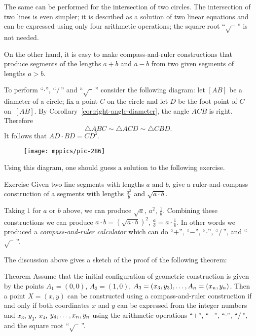 The same can be performed for the intersection of two circles. 
The intersection of two lines is even simpler; 
it is described as a solution of two linear equations and can be expressed using only four arithmetic operations;
the square root ``$\sqrt{\phantom{a}}\,$'' is not needed.

\medskip

On the other hand, it is easy to make compass-and-ruler constructions that produce segments of the lengths $a+b$ and $a-b$ from two given segments of lengths $a>b$.

To perform ``$\cdot$'', ``$/\,$''
and ``$\sqrt{\phantom{a}}\,$'' consider the following diagram:
let $[AB]$ be a diameter of a circle; 
fix a point $C$ on the circle and let $D$ be the foot point of $C$ on~$[AB]$.
By Corollary~\ref{cor:right-angle-diameter}, the angle $ACB$ is right.
Therefore 
$$\triangle ABC\sim\triangle ACD\sim \triangle CBD.$$
It follows that $AD\cdot BD=CD^2$. 

{

\begin{wrapfigure}[7]{r}{37mm}
\vskip-0mm
\centering
\texttt{[image: mppics/pic-286]}
\end{wrapfigure}

Using this diagram, one should guess a solution to the following exercise.

\begin{thm}{Exercise}\label{ex:a2/b}
Given two line segments with lengths $a$ and $b$, give a ruler-and-compass construction of a segments with lengths $\tfrac {a^2}b$ and $\sqrt{a\cdot b}$.
\end{thm}

Taking $1$ for $a$ or $b$ above, we can produce 
$\sqrt a$, $a^2$, $\tfrac1b$.
Combining these constructions we can produce
$a\cdot b=(\sqrt{a\cdot b})^2$,
$\tfrac ab=a\cdot\tfrac 1b$.
In other words we produced a \emph{compass-and-ruler calculator} which can do ``$+$'', ``$-$'', ``$\cdot$'', ``$/\,$'', and ``$\sqrt{\phantom{a}}\,$''.

}

The discussion above gives a sketch of the proof of the following theorem:
 
\begin{thm}{Theorem}\label{thm:constructible-numbers}
Assume that the initial configuration of geometric construction is given by the points $A_1=(0,0)$, $A_2=(1,0)$, $A_3\z=(x_3,y_3),\z\dots,A_n=(x_n,y_n)$.
Then a point $X=(x,y)$ can be constructed using a compass-and-ruler construction
if and only if both coordinates $x$ and $y$ can be expressed from the integer numbers and $x_3$, $y_3$, $x_4$, $y_4,\z\dots,x_n,y_n$ using the arithmetic operations ``$+$'', ``$-$'', ``$\cdot$'', ``$/\,$'', and the square root ``$\sqrt{\phantom{a}}\,$''.
\end{thm}

